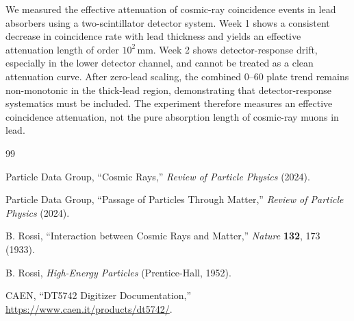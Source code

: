\documentclass[aps,prl,twocolumn,superscriptaddress,nofootinbib]{revtex4-2}
\begin{document}
We measured the effective attenuation of cosmic-ray coincidence events in lead absorbers using a two-scintillator detector system. Week 1 shows a consistent decrease in coincidence rate with lead thickness and yields an effective attenuation length of order $10^2\,\mathrm{mm}$. Week 2 shows detector-response drift, especially in the lower detector channel, and cannot be treated as a clean attenuation curve. After zero-lead scaling, the combined 0--60 plate trend remains non-monotonic in the thick-lead region, demonstrating that detector-response systematics must be included. The experiment therefore measures an effective coincidence attenuation, not the pure absorption length of cosmic-ray muons in lead.

\begin{thebibliography}{99}

Particle Data Group, ``Cosmic Rays,'' \textit{Review of Particle Physics} (2024).

Particle Data Group, ``Passage of Particles Through Matter,'' \textit{Review of Particle Physics} (2024).

B. Rossi, ``Interaction between Cosmic Rays and Matter,'' \textit{Nature} \textbf{132}, 173 (1933).

B. Rossi, \textit{High-Energy Particles} (Prentice-Hall, 1952).

CAEN, ``DT5742 Digitizer Documentation,'' \url{https://www.caen.it/products/dt5742/}.

\end{thebibliography}
\end{document}
